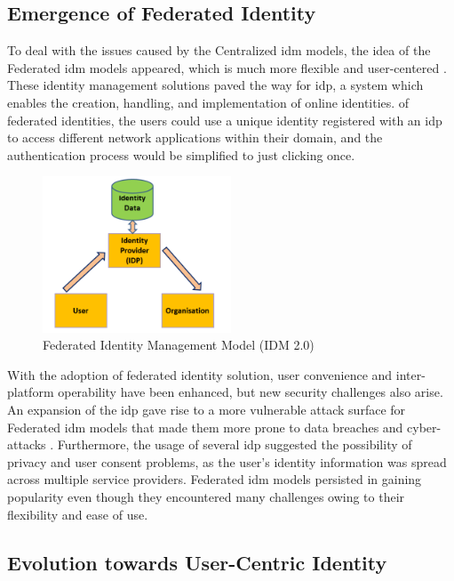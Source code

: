 \subsection{Emergence of Federated Identity}

To deal with the issues caused by the Centralized \gls{idm} models, the idea of the Federated \gls{idm} models appeared, which is much more flexible and user-centered 
\cite{9695553}. These identity management solutions paved the way for \gls{idp}, a system which enables the creation, handling, and implementation of online 
identities.  of federated identities, the users could use a unique identity registered with an \gls{idp} to access different network applications within their
domain, and the authentication process would be simplified to just clicking once.

\begin{figure}[h]  
  \centering
  \includegraphics[width=0.5\textwidth]{Images/c3_3.png} 
  \caption{Federated Identity Management Model (IDM 2.0)}
\end{figure}

With the adoption of federated identity solution, user convenience and inter-platform operability have been enhanced, but new security challenges also arise. An expansion
of the \gls{idp} gave rise to a more vulnerable attack surface for Federated \gls{idm} models that made them more prone to data breaches and cyber-attacks \cite{9695553}. 
Furthermore, the usage of several \gls{idp} suggested the possibility of privacy and user consent problems, as the user’s identity information was spread across multiple 
service providers. Federated \gls{idm} models persisted in gaining popularity even though they encountered many challenges owing to their flexibility and ease of use.

\subsection{Evolution towards User-Centric Identity}

